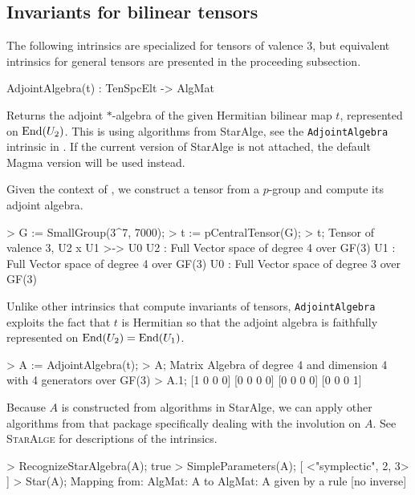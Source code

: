 \subsection{Invariants for bilinear tensors}

The following intrinsics are specialized for tensors of valence 3, but equivalent intrinsics for general tensors are presented in the proceeding subsection.

\begin{intrinsics}
AdjointAlgebra(t) : TenSpcElt -> AlgMat
\end{intrinsics}

Returns the adjoint $*$-algebra of the given Hermitian bilinear map $t$, represented on $\operatorname{End}(U_2)$. 
This is using algorithms from {\sc StarAlge}, see the \texttt{AdjointAlgebra} intrinsic in \cite{BW:StarAlge}.
If the current version of {\sc StarAlge} is not attached, the default {\sc Magma} version will be used instead.

\begin{example}[AdjointAlge]

Given the context of \cite{BW:isometry}, we construct a tensor from a $p$-group and compute its adjoint algebra.
\begin{code}
> G := SmallGroup(3^7, 7000);
> t := pCentralTensor(G);
> t;
Tensor of valence 3, U2 x U1 >-> U0
U2 : Full Vector space of degree 4 over GF(3)
U1 : Full Vector space of degree 4 over GF(3)
U0 : Full Vector space of degree 3 over GF(3)
\end{code}

Unlike other intrinsics that compute invariants of tensors, \texttt{AdjointAlgebra} exploits the fact that $t$ is Hermitian so that the adjoint algebra is faithfully represented on $\operatorname{End}(U_2)=\operatorname{End}(U_1)$. 
\begin{code}
> A := AdjointAlgebra(t);
> A;
Matrix Algebra of degree 4 and dimension 4 with 4 generators over GF(3)
> A.1;
[1 0 0 0]
[0 0 0 0]
[0 0 0 0]
[0 0 0 1]
\end{code}

Because $A$ is constructed from algorithms in {\sc StarAlge}, we can apply other algorithms from that package specifically dealing with the involution on $A$.
See \textsc{StarAlge} \cite{BW:StarAlge} for descriptions of the intrinsics.
\begin{code}
> RecognizeStarAlgebra(A);
true
> SimpleParameters(A);
[ <"symplectic", 2, 3> ]
> Star(A);
Mapping from: AlgMat: A to AlgMat: A given by a rule [no inverse]
\end{code}
\end{example}

